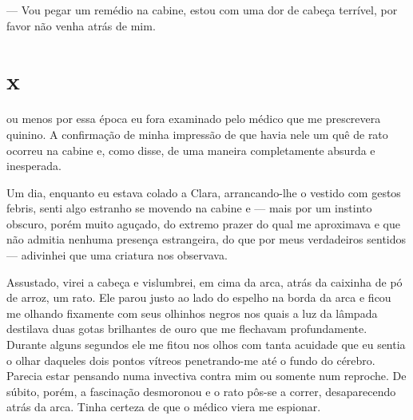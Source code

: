 
--- Vou pegar um remédio na cabine, estou com uma dor de cabeça terrível, por
    favor não venha atrás de mim.



\section{x} 

 ou menos por essa época eu fora examinado pelo médico que me
 prescrevera quinino. A confirmação de minha impressão de que havia nele um
 quê de rato ocorreu na cabine e, como disse, de uma maneira completamente
 absurda e inesperada. 

Um dia, enquanto eu estava colado a Clara, arrancando-lhe o vestido com gestos
febris, senti algo estranho se movendo na cabine e --- mais por um instinto
obscuro, porém muito aguçado, do extremo prazer do qual me aproximava e que
não admitia nenhuma presença estrangeira, do que por meus verdadeiros
sentidos --- adivinhei que uma criatura nos observava.

Assustado, virei a cabeça e vislumbrei, em cima da arca, atrás da caixinha de
pó de arroz, um rato. Ele parou justo ao lado do espelho na borda da arca e
ficou me olhando fixamente com seus olhinhos negros nos quais a luz da
lâmpada destilava duas gotas brilhantes de ouro que me flechavam
profundamente. Durante alguns segundos ele me fitou nos olhos com tanta
acuidade que eu sentia o olhar daqueles dois pontos vítreos penetrando-me até
o fundo do cérebro. Parecia estar pensando numa invectiva contra mim ou
somente num reproche. De súbito, porém, a fascinação desmoronou e o rato
pôs-se a correr, desaparecendo atrás da arca. Tinha certeza de que o médico
viera me espionar.

